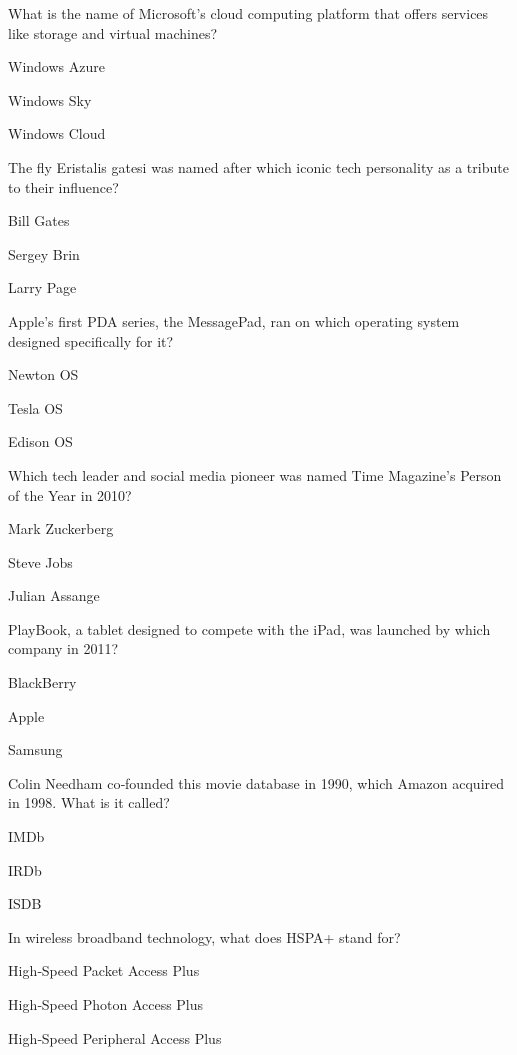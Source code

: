 \begin{enhancedmcq}{What is the name of Microsoft's cloud computing platform that offers services like storage and virtual machines?}
\item Windows Azure
\item Windows Sky
\item Windows Cloud

\end{enhancedmcq}
\begin{enhancedmcq}{The fly Eristalis gatesi was named after which iconic tech personality as a tribute to their influence?}
\item Bill Gates
\item Sergey Brin
\item Larry Page

\end{enhancedmcq}
\begin{enhancedmcq}{Apple's first PDA series, the MessagePad, ran on which operating system designed specifically for it?}
\item Newton OS
\item Tesla OS
\item Edison OS

\end{enhancedmcq}
\begin{enhancedmcq}{Which tech leader and social media pioneer was named Time Magazine's Person of the Year in 2010?}
\item Mark Zuckerberg
\item Steve Jobs
\item Julian Assange

\end{enhancedmcq}
\begin{enhancedmcq}{PlayBook, a tablet designed to compete with the iPad, was launched by which company in 2011?}
\item BlackBerry
\item Apple
\item Samsung

\end{enhancedmcq}
\begin{enhancedmcq}{Colin Needham co‑founded this movie database in 1990, which Amazon acquired in 1998. What is it called?}
\item IMDb
\item IRDb
\item ISDB

\end{enhancedmcq}
\begin{enhancedmcq}{In wireless broadband technology, what does HSPA+ stand for?}
\item High‑Speed Packet Access Plus
\item High‑Speed Photon Access Plus
\item High‑Speed Peripheral Access Plus

\end{enhancedmcq}
